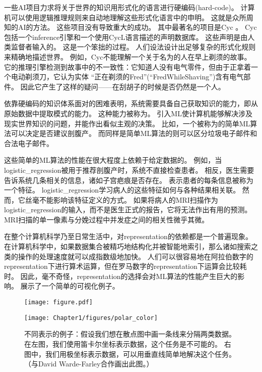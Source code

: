 一些\gls{AI}项目力求将关于世界的知识用形式化的语言进行硬编码(hard-code)。
计算机可以使用逻辑推理规则来自动地理解这些形式化语言中的申明。
这就是众所周知的\gls{AI}的方法。
这些项目没有导致重大的成功。
其中最著名的项目是Cyc \citep{Lenat-1989-book}。
Cyc包括一个\gls{inference}引擎和一个使用CycL语言描述的声明数据库。
这些声明是由人类监督者输入的。
这是一个笨拙的过程。
人们设法设计出足够复杂的形式化规则来精确地描述世界。
例如，Cyc不能理解一个关于名为的人在早上剃须的故事\citep{MachineChangedWorld}。
它的推理引擎检测到故事中的不一致性：它知道人没有电气零件，但由于正拿着一个电动剃须刀，它认为实体
``正在剃须的Fred''(``FredWhileShaving'')含有电气部件。
因此它产生了这样的疑问——在刮胡子的时候是否仍然是一个人。

依靠硬编码的知识体系面对的困难表明，系统需要具备自己获取知识的能力，即从原始数据中提取模式的能力。
这种能力被称为。
引入\gls{ML}使计算机能够解决涉及现实世界知识的问题，并能作出看似主观的决策。
比如，一个被称为的简单\gls{ML}算法可以决定是否建议剖腹产\citep{MorYosef90}。
而同样是简单\gls{ML}算法的则可以区分垃圾电子邮件和合法电子邮件。


这些简单的\gls{ML}算法的性能在很大程度上依赖于给定数据的。
例如，当\gls{logistic_regression}被用于推荐剖腹产时，系统不直接检查患者。
相反，医生需要告诉系统几条相关的信息，诸如子宫疤痕是否存在。
表示患者的每条信息被称为一个特征。
\gls{logistic_regression}学习病人的这些特征如何与各种结果相关联。
然而，它丝毫不能影响该特征定义的方式。
如果将病人的MRI扫描作为\gls{logistic_regression}的输入，而不是医生正式的报告，它将无法作出有用的预测。
MRI扫描的单一像素与分娩过程中并发症之间的相关性微乎其微。

在整个计算机科学乃至日常生活中，对\gls{representation}的依赖都是一个普遍现象。
在计算机科学中，如果数据集合被精巧地结构化并被智能地索引，那么诸如搜索之类的操作的处理速度就可以成指数级地加快。
人们可以很容易地在阿拉伯数字的\gls{representation}下进行算术运算，但在罗马数字的\gls{representation}下运算会比较耗时。
因此，毫不奇怪，\gls{representation}的选择会对\gls{ML}算法的性能产生巨大的影响。
展示了一个简单的可视化例子。

\begin{figure}[!htb]
\ifOpenSource
\centerline{\texttt{[image: figure.pdf]}}
\else
\centerline{\texttt{[image: Chapter1/figures/polar\_color]}}
\fi
\caption{不同表示的例子：假设我们想在散点图中画一条线来分隔两类数据。
在左图，我们使用笛卡尔坐标表示数据，这个任务是不可能的。 
右图中，我们用极坐标表示数据，可以用垂直线简单地解决这个任务。（与David Warde-Farley合作画出此图。）}
\label{fig:chap1_polar}
\end{figure}

